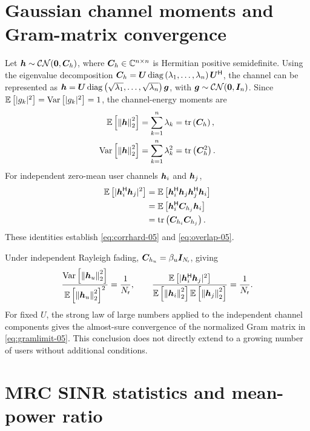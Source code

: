 \clearpage

\section{Gaussian channel moments and Gram-matrix convergence}
\label{app:moments-05}

Let $\bm{h}\sim\mathcal{CN}(\bm{0},\bm{C}_h)$, where $\bm{C}_h\in\mathbb{C}^{n\times n}$ is Hermitian positive semidefinite. Using the eigenvalue decomposition $\bm{C}_h=\bm{U}\operatorname{diag}\left(\lambda_1,\ldots,\lambda_n\right){\bm{U}}^{\mathsf{H}}$, the channel can be represented as $\bm{h}=\bm{U}\operatorname{diag}\left(\sqrt{\lambda_1},\ldots,\sqrt{\lambda_n}\right)\bm{g}$, with $\bm{g}\sim\mathcal{CN}(\bm{0},\bm{I}_n)$. Since $\mathbb{E}\left[|g_k|^2\right]=\operatorname{Var}\left[|g_k|^2\right]=1$, the channel-energy moments are
\begin{equation}
	\begin{split}
		\mathbb{E}\left[\left\|\bm{h}\right\|_2^2\right]
		&=\sum_{k=1}^{n}\lambda_k=\operatorname{tr}\left(\bm{C}_h\right),\\
		\operatorname{Var}\left[\left\|\bm{h}\right\|_2^2\right]
		&=\sum_{k=1}^{n}\lambda_k^2=\operatorname{tr}\left(\bm{C}_h^2\right).
	\end{split}
\end{equation}
For independent zero-mean user channels $\bm{h}_i$ and $\bm{h}_j$,
\begin{equation}
	\begin{split}
		\mathbb{E}\left[|{\bm{h}}^{\mathsf{H}}_i\bm{h}_j|^2\right]
		&=\mathbb{E}\left[{\bm{h}}^{\mathsf{H}}_i\bm{h}_j{\bm{h}}^{\mathsf{H}}_j\bm{h}_i\right]\\
		&=\mathbb{E}\left[{\bm{h}}^{\mathsf{H}}_i\bm{C}_{h_j}\bm{h}_i\right]\\
		&=\operatorname{tr}\left(\bm{C}_{h_i}\bm{C}_{h_j}\right).
	\end{split}
\end{equation}
These identities establish \eqref{eq:corrhard-05} and \eqref{eq:overlap-05}.

Under independent Rayleigh fading, $\bm{C}_{h_u}=\beta_u\bm{I}_{N_{\mathsf{r}}}$, giving
\begin{equation*}
	\frac{\operatorname{Var}\left[\left\|\bm{h}_u\right\|_2^2\right]}
	{\mathbb{E}\left[\left\|\bm{h}_u\right\|_2^2\right]^2}
	=\frac{1}{N_{\mathsf{r}}},
	\qquad
	\frac{\mathbb{E}\left[|{\bm{h}}^{\mathsf{H}}_i\bm{h}_j|^2\right]}
	{\mathbb{E}\left[\left\|\bm{h}_i\right\|_2^2\right]\mathbb{E}\left[\left\|\bm{h}_j\right\|_2^2\right]}
	=\frac{1}{N_{\mathsf{r}}}.
\end{equation*}
For fixed $U$, the strong law of large numbers applied to the independent channel components gives the almost-sure convergence of the normalized Gram matrix in \eqref{eq:gramlimit-05}. This conclusion does not directly extend to a growing number of users without additional conditions.


\section{MRC SINR statistics and mean-power ratio}
\label{app:mrc-05}

